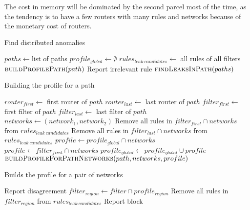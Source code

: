 The cost in memory will be dominated by the second parcel most of the time, as
the tendency is to have a few routers with many rules and networks because of
the monetary cost of routers.

\begin{algorithm}
	\caption{\label{alg:anomdistr}Find distributed anomalies}
	\begin{algorithmic}[1]
			\State $paths \gets $list of paths
			\State $profile_{global} \gets \emptyset$
			\State $rules_{leak~candidates} \gets $ all rules of all filters
				\State $\Calll{buildProfilePath}{path}$
			\EndFor
				\State Report irrelevant rule
			\EndFor
				\State $\Calll{findLeaksInPath}{paths}$
			\EndFor
		\EndFunction
	\end{algorithmic}
\end{algorithm}

\begin{algorithm}
	\caption{\label{alg:buildprof}Building the profile for a path}
	\begin{algorithmic}[1]
			\State $router_{first} \gets $ first router of $path$
			\State $router_{last} \gets $ last router of $path$
			\State $filter_{first} \gets $ first filter of $path$
			\State $filter_{last} \gets $ last filter of $path$
					\State $networks \gets (network_1, network_2)$
					\State Remove all rules in $filter_{first} \cap networks$ from $rules_{leak~candidates}$
					\State Remove all rules in $filter_{last} \cap networks$ from $rules_{leak~candidates}$
					\State $profile \gets profile_{global} \cap networks$
						\State $profile \gets filter_{first} \cap networks$
						\State $profile_{global} \gets profile_{global} \cup profile$
					\EndIf
					\State $\Calll{buildProfileForPathNetworks}{path, networks, profile}$
				\EndFor
			\EndFor
		\EndFunction
	\end{algorithmic}
\end{algorithm}

\begin{algorithm}
	\caption{\label{alg:checkonepath}Builds the profile for a pair of networks}
	\begin{algorithmic}[1]
					\State Report disagreement
				\EndIf
			\EndFor
						\State $filter_{region} \gets filter \cap profile_{region}$
						\State Remove all rules in $filter_{region}$ from $rules_{leak~candidates}$
							\State Report block
						\EndIf
					\EndFor
				\EndIf
			\EndFor
		\EndFunction
	\end{algorithmic}
\end{algorithm}

